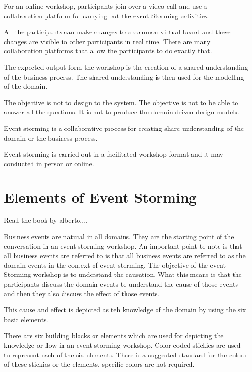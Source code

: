 \documentclass[a4paper, 11pt]{book}
\begin{document}
    For an online workshop, participants join over a video call and use a collaboration platform for carrying out the event Storming activities.

    All the participants can make changes to a common virtual board and these changes are visible to other participants in real time.
    There are many collaboration platforms that allow the participants to do exactly that.

    The expected output form the workshop is the creation of a shared understanding of the business process.
    The shared understanding is then used for the modelling of the domain.

    The objective is not to design to the system.
    The objective is not to be able to answer all the questions.
    It is not to produce the domain driven design models.

    Event storming is a collaborative process for creating share understanding of the domain or the business process.

    Event storming is carried out in a facilitated workshop format and it may conducted in person or online.


    \section{Elements of Event Storming}

    Read the book by alberto....

    Business events are natural in all domains.
    They are the starting point of the conversation in an event storming workshop.
    An important point to note is that all business events are referred to is that all business events are referred to as the domain events in the context of event storming.
    The objective of the event Storming workshop is to understand the causation.
    What this means is that the participants discuss the domain events to understand the cause of those events and then they also discuss the effect of those events.

    This cause and effect is depicted as teh knowledge of the domain by using the six basic elements.

    There are six building blocks or elements which are used for depicting the knowledge or flow in an event storming workshop.
    Color coded stickies are used to represent each of the six elements.
    There is a suggested standard for the colors of these stickies or the elements, specific colors are not required.
\end{document}
